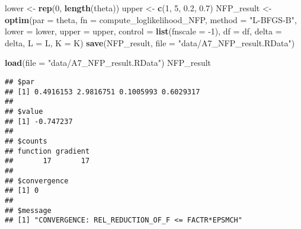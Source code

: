 \documentclass[
]{book}
\newenvironment{Shaded}{\begin{snugshade}}{\end{snugshade}}
\newcommand{\DataTypeTok}[1]{\textcolor[rgb]{0.13,0.29,0.53}{#1}}
\newcommand{\DecValTok}[1]{\textcolor[rgb]{0.00,0.00,0.81}{#1}}
\newcommand{\FloatTok}[1]{\textcolor[rgb]{0.00,0.00,0.81}{#1}}
\newcommand{\KeywordTok}[1]{\textcolor[rgb]{0.13,0.29,0.53}{\textbf{#1}}}
\newcommand{\NormalTok}[1]{#1}
\newcommand{\OperatorTok}[1]{\textcolor[rgb]{0.81,0.36,0.00}{\textbf{#1}}}
\newcommand{\StringTok}[1]{\textcolor[rgb]{0.31,0.60,0.02}{#1}}
\begin{document}
\begin{Shaded}
\begin{Highlighting}[]
\NormalTok{lower <-}\StringTok{ }\KeywordTok{rep}\NormalTok{(}\DecValTok{0}\NormalTok{, }\KeywordTok{length}\NormalTok{(theta))}
\NormalTok{upper <-}\StringTok{ }\KeywordTok{c}\NormalTok{(}\DecValTok{1}\NormalTok{, }\DecValTok{5}\NormalTok{, }\FloatTok{0.2}\NormalTok{, }\FloatTok{0.7}\NormalTok{)}
\NormalTok{NFP_result <-}
\StringTok{  }\KeywordTok{optim}\NormalTok{(}\DataTypeTok{par =}\NormalTok{ theta,}
        \DataTypeTok{fn =}\NormalTok{ compute_loglikelihood_NFP,}
        \DataTypeTok{method =} \StringTok{"L-BFGS-B"}\NormalTok{,}
        \DataTypeTok{lower =}\NormalTok{ lower,}
        \DataTypeTok{upper =}\NormalTok{ upper,}
        \DataTypeTok{control =} \KeywordTok{list}\NormalTok{(}\DataTypeTok{fnscale =} \DecValTok{-1}\NormalTok{),}
        \DataTypeTok{df =}\NormalTok{ df, }
        \DataTypeTok{delta =}\NormalTok{ delta,}
        \DataTypeTok{L =}\NormalTok{ L,}
        \DataTypeTok{K =}\NormalTok{ K)}
\KeywordTok{save}\NormalTok{(NFP_result, }\DataTypeTok{file =} \StringTok{"data/A7_NFP_result.RData"}\NormalTok{)}
\end{Highlighting}
\end{Shaded}

\begin{Shaded}
\begin{Highlighting}[]
\KeywordTok{load}\NormalTok{(}\DataTypeTok{file =} \StringTok{"data/A7_NFP_result.RData"}\NormalTok{)}
\NormalTok{NFP_result}
\end{Highlighting}
\end{Shaded}

\begin{verbatim}
## $par
## [1] 0.4916153 2.9816751 0.1005993 0.6029317
## 
## $value
## [1] -0.747237
## 
## $counts
## function gradient 
##       17       17 
## 
## $convergence
## [1] 0
## 
## $message
## [1] "CONVERGENCE: REL_REDUCTION_OF_F <= FACTR*EPSMCH"
\end{verbatim}

\begin{Shaded}
\end{Shaded}
\end{document}
